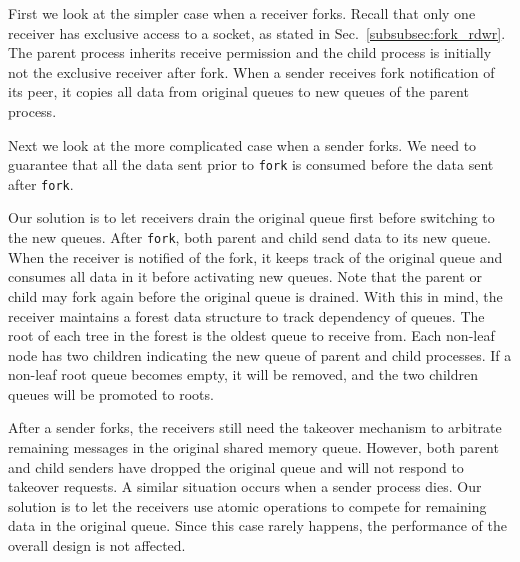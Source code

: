 
First we look at the simpler case when a receiver forks. Recall that only one receiver has exclusive access to a socket, as stated in Sec.~\ref{subsubsec:fork_rdwr}. The parent process inherits receive permission and the child process is initially not the exclusive receiver after fork. When a sender receives fork notification of its peer, it copies all data from original queues to new queues of the parent process.

Next we look at the more complicated case when a sender forks. We need to guarantee that all the data sent prior to \texttt{fork} is consumed before the data sent after \texttt{fork}.

Our solution is to let receivers drain the original queue first before switching to the new queues. After \texttt{fork}, both parent and child send data to its new queue. When the receiver is notified of the fork, it keeps track of the original queue and consumes all data in it before activating new queues. Note that the parent or child may fork again before the original queue is drained. With this in mind, the receiver maintains a forest data structure to track dependency of queues. The root of each tree in the forest is the oldest queue to receive from. Each non-leaf node has two children indicating the new queue of parent and child processes. If a non-leaf root queue becomes empty, it will be removed, and the two children queues will be promoted to roots.

After a sender forks, the receivers still need the takeover mechanism to arbitrate remaining messages in the original shared memory queue. However, both parent and child senders have dropped the original queue and will not respond to takeover requests. A similar situation occurs when a sender process dies. Our solution is to let the receivers use atomic operations to compete for remaining data in the original queue. Since this case rarely happens, the performance of the overall design is not affected.



